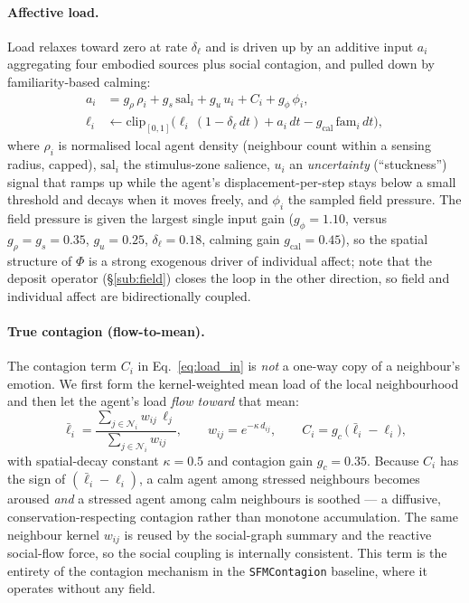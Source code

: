 \documentclass[sigconf,nonacm]{acmart}
\begin{document}
\paragraph{Affective load.} Load relaxes toward zero at rate $\delta_\ell$ and is driven up by an additive input $a_i$ aggregating four embodied sources plus social contagion, and pulled down by familiarity-based calming:
\begin{align}
a_i &= g_\rho\,\rho_i + g_s\,\mathrm{sal}_i + g_u\,u_i + C_i + g_\phi\,\phi_i, \label{eq:load_in}\\
\ell_i &\leftarrow \mathrm{clip}_{[0,1]}\!\Big(\ell_i\,(1-\delta_\ell\,dt) + a_i\,dt - g_{\mathrm{cal}}\,\mathrm{fam}_i\,dt\Big),
\end{align}
where $\rho_i$ is normalised local agent density (neighbour count within a sensing radius, capped), $\mathrm{sal}_i$ the stimulus-zone salience, $u_i$ an \emph{uncertainty} (``stuckness'') signal that ramps up while the agent's displacement-per-step stays below a small threshold and decays when it moves freely, and $\phi_i$ the sampled field pressure. The field pressure is given the largest single input gain ($g_\phi=1.10$, versus $g_\rho=g_s=0.35$, $g_u=0.25$, $\delta_\ell=0.18$, calming gain $g_{\mathrm{cal}}=0.45$), so the spatial structure of $\Phi$ is a strong exogenous driver of individual affect; note that the deposit operator (\S\ref{sub:field}) closes the loop in the other direction, so field and individual affect are bidirectionally coupled.

\paragraph{True contagion (flow-to-mean).} The contagion term $C_i$ in Eq.~\eqref{eq:load_in} is \emph{not} a one-way copy of a neighbour's emotion. We first form the kernel-weighted mean load of the local neighbourhood and then let the agent's load \emph{flow toward} that mean:
\begin{equation}
\bar{\ell}_i = \frac{\sum_{j\in\mathcal{N}_i} w_{ij}\,\ell_j}{\sum_{j\in\mathcal{N}_i} w_{ij}},\qquad
w_{ij}=e^{-\kappa\,d_{ij}},\qquad
C_i = g_c\,\big(\bar{\ell}_i - \ell_i\big),
\label{eq:contagion}
\end{equation}
with spatial-decay constant $\kappa=0.5$ and contagion gain $g_c=0.35$. Because $C_i$ has the sign of $(\bar{\ell}_i-\ell_i)$, a calm agent among stressed neighbours becomes aroused \emph{and} a stressed agent among calm neighbours is soothed --- a diffusive, conservation-respecting contagion rather than monotone accumulation. The same neighbour kernel $w_{ij}$ is reused by the social-graph summary and the reactive social-flow force, so the social coupling is internally consistent. This term is the entirety of the contagion mechanism in the \texttt{SFMContagion} baseline, where it operates without any field.
\end{document}
